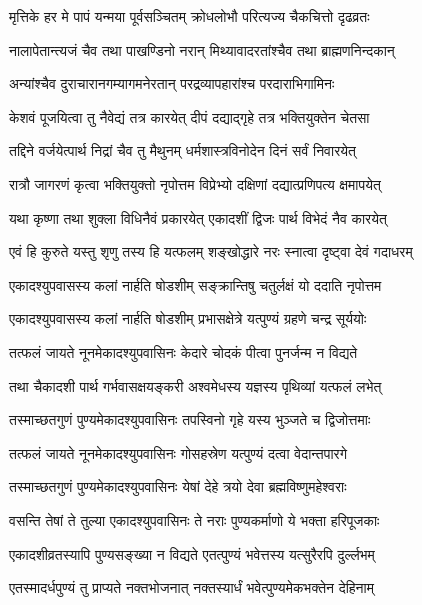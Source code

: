 \twolineshloka
{मृत्तिके हर मे पापं यन्मया पूर्वसञ्चितम्}
{क्रोधलोभौ परित्यज्य चैकचित्तो दृढव्रतः}%

\twolineshloka
{नालापेतान्त्यजं चैव तथा पाखण्डिनो नरान्}
{मिथ्यावादरतांश्चैव तथा ब्राह्मणनिन्दकान्}%

\twolineshloka
{अन्यांश्चैव दुराचारानगम्यागमनेरतान्}
{परद्रव्यापहारांश्च परदाराभिगामिनः}%

\twolineshloka
{केशवं पूजयित्वा तु नैवेद्यं तत्र कारयेत्}
{दीपं दद्याद्गृहे तत्र भक्तियुक्तेन चेतसा}%

\twolineshloka
{तद्दिने वर्जयेत्पार्थ निद्रां चैव तु मैथुनम्}
{धर्मशास्त्रविनोदेन दिनं सर्वं निवारयेत्}%

\twolineshloka
{रात्रौ जागरणं कृत्वा भक्तियुक्तो नृपोत्तम}
{विप्रेभ्यो दक्षिणां दद्यात्प्रणिपत्य क्षमापयेत्}%

\twolineshloka
{यथा कृष्णा तथा शुक्ला विधिनैवं प्रकारयेत्}
{एकादशीं द्विजः पार्थ विभेदं नैव कारयेत्}%

\twolineshloka
{एवं हि कुरुते यस्तु शृणु तस्य हि यत्फलम्}
{शङ्खोद्धारे नरः स्नात्वा दृष्ट्वा देवं गदाधरम्}%

\twolineshloka
{एकादश्युपवासस्य कलां नार्हति षोडशीम्}
{सङ्क्रान्तिषु चतुर्लक्षं यो ददाति नृपोत्तम}%

\twolineshloka
{एकादश्युपवासस्य कलां नार्हति षोडशीम्}
{प्रभासक्षेत्रे यत्पुण्यं ग्रहणे चन्द्र सूर्ययोः}%

\twolineshloka
{तत्फलं जायते नूनमेकादश्युपवासिनः}
{केदारे चोदकं पीत्वा पुनर्जन्म न विद्यते}%

\twolineshloka
{तथा चैकादशी पार्थ गर्भवासक्षयङ्करी}
{अश्वमेधस्य यज्ञस्य पृथिव्यां यत्फलं लभेत्}%

\twolineshloka
{तस्माच्छतगुणं पुण्यमेकादश्युपवासिनः}
{तपस्विनो गृहे यस्य भुञ्जते च द्विजोत्तमाः}%

\twolineshloka
{तत्फलं जायते नूनमेकादश्युपवासिनः}
{गोसहस्रेण यत्पुण्यं दत्वा वेदान्तपारगे}%

\twolineshloka
{तस्माच्छतगुणं पुण्यमेकादश्युपवासिनः}
{येषां देहे त्रयो देवा ब्रह्मविष्णुमहेश्वराः}%

\twolineshloka
{वसन्ति तेषां ते तुल्या एकादश्युपवासिनः}
{ते नराः पुण्यकर्माणो ये भक्ता हरिपूजकाः}%

\twolineshloka
{एकादशीव्रतस्यापि पुण्यसङ्ख्या न विद्यते}
{एतत्पुण्यं भवेत्तस्य यत्सुरैरपि दुर्ल्लभम्}%

\twolineshloka
{एतस्मादर्धपुण्यं तु प्राप्यते नक्तभोजनात्}
{नक्तस्यार्धं भवेत्पुण्यमेकभक्तेन देहिनाम्}%


